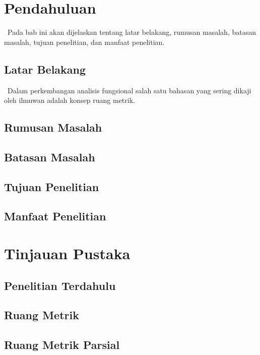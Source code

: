 \documentclass[12pt]{article}
\numberwithin{lemma}{subsection}
\begin{document}
\pagebreak
{}
\section{Pendahuluan}
$\,$\hskip 1cm Pada bab ini akan dijelaskan tentang latar belakang, rumusan masalah, batasan masalah, tujuan penelitian, dan manfaat penelitian. 
\subsection{Latar Belakang}
$\,$\hskip 1cm Dalam perkembangan analisis fungsional salah satu bahasan yang sering dikaji oleh ilmuwan adalah konsep ruang metrik\cite{aufa}. %
\subsection{Rumusan Masalah}

\subsection{Batasan Masalah}


\subsection{Tujuan Penelitian}

\subsection{Manfaat Penelitian}


\pagebreak
\section{Tinjauan Pustaka}
\hskip 1cm 

\subsection{Penelitian Terdahulu}
\hskip 0.8cm

\subsection{Ruang Metrik}

\subsection{Ruang Metrik Parsial}
\end{document}
